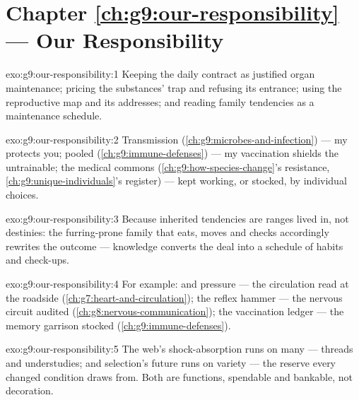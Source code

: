 \section*{Chapter \ref{ch:g9:our-responsibility} --- Our Responsibility}

\begin{solution}{exo:g9:our-responsibility:1}
Keeping the daily contract as justified organ maintenance;
pricing the substances' trap and refusing its entrance;
using the reproductive map and its addresses; and reading
family tendencies as a maintenance schedule.
\end{solution}

\begin{solution}{exo:g9:our-responsibility:2}
Transmission (\cref{ch:g9:microbes-and-infection}) --- my
 protects you; pooled 
(\cref{ch:g9:immune-defenses}) --- my vaccination shields
the untrainable; the medical commons
(\cref{ch:g9:how-species-change}'s resistance,
\cref{ch:g9:unique-individuals}'s  register) ---
kept working, or stocked, by individual choices.
\end{solution}

\begin{solution}{exo:g9:our-responsibility:3}
Because inherited tendencies are ranges lived in, not
destinies: the furring-prone family that eats, moves and
checks accordingly rewrites the outcome --- knowledge
converts the deal into a schedule of habits and
check-ups.
\end{solution}

\begin{solution}{exo:g9:our-responsibility:4}
For example:  and pressure --- the circulation read
at the roadside (\cref{ch:g7:heart-and-circulation}); the
reflex hammer --- the nervous circuit audited
(\cref{ch:g8:nervous-communication}); the vaccination
ledger --- the memory garrison stocked
(\cref{ch:g9:immune-defenses}).
\end{solution}

\begin{solution}{exo:g9:our-responsibility:5}
The web's shock-absorption runs on many  ---
threads and understudies; and selection's future runs on
variety --- the reserve every changed condition draws
from. Both are functions, spendable and bankable, not
decoration.
\end{solution}

